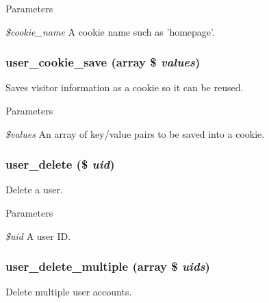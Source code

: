 \begin{DoxyParams}{Parameters}
\item[{\em \$cookie\_\-name}]A cookie name such as 'homepage'. \end{DoxyParams}
\hypertarget{user_8module_a530af19399abbe704a0ebe37a3cc13e4}{
\subsubsection[{user\_\-cookie\_\-save}]{\setlength{\rightskip}{0pt plus 5cm}user\_\-cookie\_\-save (array \$ {\em values})}}
\label{user_8module_a530af19399abbe704a0ebe37a3cc13e4}
Saves visitor information as a cookie so it can be reused.


\begin{DoxyParams}{Parameters}
\item[{\em \$values}]An array of key/value pairs to be saved into a cookie. \end{DoxyParams}
\hypertarget{user_8module_aeed10f2e053a5b6ccb57e22937961c77}{
\subsubsection[{user\_\-delete}]{\setlength{\rightskip}{0pt plus 5cm}user\_\-delete (\$ {\em uid})}}
\label{user_8module_aeed10f2e053a5b6ccb57e22937961c77}
Delete a user.


\begin{DoxyParams}{Parameters}
\item[{\em \$uid}]A user ID. \end{DoxyParams}
\hypertarget{user_8module_a3c8aa34b1ef0c113327f7151cb6f2e35}{
\subsubsection[{user\_\-delete\_\-multiple}]{\setlength{\rightskip}{0pt plus 5cm}user\_\-delete\_\-multiple (array \$ {\em uids})}}
\label{user_8module_a3c8aa34b1ef0c113327f7151cb6f2e35}
Delete multiple user accounts.


